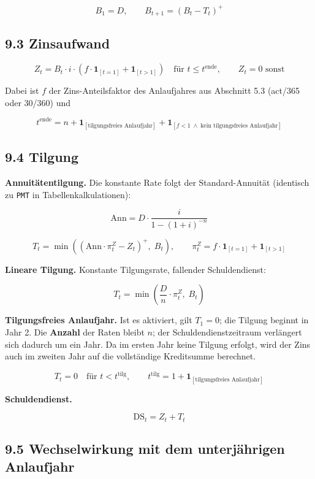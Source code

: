 \documentclass[
  a4paper,
  10pt]{article}
\begin{document}
\[ B_1 = D, \qquad B_{t+1} = \left(B_t - T_t\right)^{+} \]

\hypertarget{zinsaufwand}{%
\subsection{9.3 Zinsaufwand}\label{zinsaufwand}}

\[ Z_t = B_t \cdot i \cdot \left(f \cdot \mathbf{1}_{[t=1]} + \mathbf{1}_{[t>1]}\right) \quad \text{für } t \leq t^{\mathrm{ende}}, \qquad Z_t = 0 \text{ sonst} \]

Dabei ist \(f\) der Zins-Anteilsfaktor des Anlaufjahres aus Abschnitt
5.3 (act/365 oder 30/360) und

\[ t^{\mathrm{ende}} = n + \mathbf{1}_{[\text{tilgungsfreies Anlaufjahr}]} + \mathbf{1}_{[f<1 \;\wedge\; \text{kein tilgungsfreies Anlaufjahr}]} \]

\hypertarget{tilgung}{%
\subsection{9.4 Tilgung}\label{tilgung}}

\textbf{Annuitätentilgung.} Die konstante Rate folgt der
Standard-Annuität (identisch zu \texttt{PMT} in Tabellenkalkulationen):

\[ \mathrm{Ann} = D \cdot \frac{i}{1 - (1+i)^{-n}} \]

\[ T_t = \min\!\left(\left(\mathrm{Ann} \cdot \pi^{Z}_t - Z_t\right)^{+},\; B_t\right),
\qquad \pi^{Z}_t = f \cdot \mathbf{1}_{[t=1]} + \mathbf{1}_{[t>1]} \]

\textbf{Lineare Tilgung.} Konstante Tilgungsrate, fallender
Schuldendienst:

\[ T_t = \min\!\left(\frac{D}{n} \cdot \pi^{Z}_t,\; B_t\right) \]

\textbf{Tilgungsfreies Anlaufjahr.} Ist es aktiviert, gilt \(T_1 = 0\);
die Tilgung beginnt in Jahr 2. Die \textbf{Anzahl} der Raten bleibt
\(n\); der Schuldendienstzeitraum verlängert sich dadurch um ein Jahr.
Da im ersten Jahr keine Tilgung erfolgt, wird der Zins auch im zweiten
Jahr auf die vollständige Kreditsumme berechnet.

\[ T_t = 0 \quad \text{für } t < t^{\mathrm{tilg}}, \qquad t^{\mathrm{tilg}} = 1 + \mathbf{1}_{[\text{tilgungsfreies Anlaufjahr}]} \]

\textbf{Schuldendienst.}

\[ \mathrm{DS}_t = Z_t + T_t \]

\hypertarget{wechselwirkung-mit-dem-unterjuxe4hrigen-anlaufjahr}{%
\subsection{9.5 Wechselwirkung mit dem unterjährigen
Anlaufjahr}\label{wechselwirkung-mit-dem-unterjuxe4hrigen-anlaufjahr}}
\end{document}
